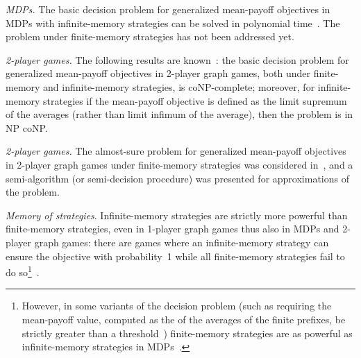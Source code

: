 \documentclass{article}
\newcommand{\half}{}
\begin{document}
\begin{compactenum}
\item {\em MDPs.} The basic decision problem for generalized mean-payoff objectives in MDPs 
with infinite-memory strategies can be solved in polynomial time~\cite{BBCFK14}. 
The problem under finite-memory strategies has not been addressed yet.

\item {\em 2-player games.} 
The following results are known~\cite{VCDHRR15}:
the basic decision problem for generalized mean-payoff objectives in 
2-player graph games, both under finite-memory and infinite-memory 
strategies, is coNP-complete;
moreover, for infinite-memory strategies if the mean-payoff objective
is defined as the limit supremum of the averages (rather than limit infimum of 
the average), then the problem is in NP  coNP.

\item {\em 2\half-player games.} 
The almost-sure problem for generalized mean-payoff objectives in 2\half-player 
graph games under finite-memory strategies was considered in~\cite{BKTW15}, and 
a semi-algorithm (or semi-decision procedure) was presented for approximations
of the problem.

\item {\em Memory of strategies}. Infinite-memory strategies are strictly more powerful than finite-memory 
strategies, even in 1-player graph games thus also in MDPs and 2-player graph games:
there are games where an infinite-memory strategy can ensure the objective with probability~1 
while all finite-memory strategies fail to do so\footnote{However, in some variants of the decision problem 
(such as requiring the mean-payoff value, computed as the  of the averages of the finite prefixes, 
be strictly greater than a threshold~) finite-memory strategies are as powerful as
infinite-memory strategies in MDPs~\cite{CR15}. }~\cite{VCDHRR15}.
\end{compactenum}
\end{document}
